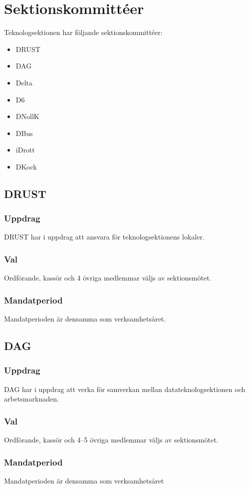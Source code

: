 \section{Sektionskommittéer}

Teknologsektionen har följande sektionskommittéer: 
\begin{itemize}
  \item DRUST 
  \item DAG 
  \item Delta 
  \item D6 
  \item DNollK
  \item DBus
  \item iDrott
  \item DKock
\end{itemize}

\subsection{DRUST} 
\subsubsection{Uppdrag}
DRUST har i uppdrag att ansvara för teknologsektionens lokaler.
\subsubsection{Val}
Ordförande, kassör och 4 övriga medlemmar väljs av sektionsmötet. 
\subsubsection{Mandatperiod}
Mandatperioden är densamma som verksamhetsåret. 

\subsection{DAG}
\subsubsection{Uppdrag} 
DAG har i uppdrag att verka för samverkan mellan datateknologsektionen och arbetsmarknaden. 
\subsubsection{Val}
Ordförande, kassör och 4--5 övriga medlemmar väljs av sektionsmötet.
\subsubsection{Mandatperiod}
Mandatperioden är densamma som verksamhetsåret

